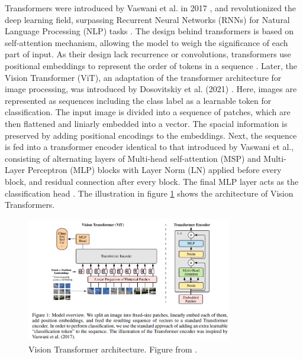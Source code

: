 Transformers were introduced by Vaswani et al. in 2017 \cite{vaswani2023attentionneed}, and revolutionized the deep learning field, surpassing Recurrent Neural Networks (RNNs) for Natural Language Processing (NLP) tasks  \cite{v7labs-vit,vaswani2023attentionneed}. The design behind transformers is based on self-attention mechanism, allowing the model to weigh the significance of each part of input. As their design lack recurrence or convolutions, transformers use positional embeddings to represent the order of tokens in a sequence \cite{vaswani2023attentionneed}. Later, the Vision Transformer (ViT), an adaptation of the transformer architecture for image processing, was introduced by Dosovitskiy et al. (2021) \cite{dosovitskiy2021imageworth16x16words}. Here, images are represented as sequences including the class label as a learnable token for classification. The input image is divided into a sequence of patches, which are then flattened and liniarly embedded into a vector. The spacial information is preserved by adding positional encodings to the embeddings. Next, the sequence is fed into a transformer encoder identical to that introduced by Vaswani et al., consisting of alternating layers of Multi-head self-attention (MSP) and Multi-Layer Perceptron (MLP) blocks with Layer Norm (LN) applied before every block, and residual connection after every block. The final MLP layer acts as the classification head \cite{dosovitskiy2021imageworth16x16words}. The illustration in figure \ref{fig:vit_arch} shows the architecture of Vision Transformers.

\begin{figure}[h!]
    \centering
    \includegraphics[width=0.8\textwidth]{Images/vit.png} 
    \caption{Vision Transformer architecture. Figure from \cite{dosovitskiy2021imageworth16x16words}. }
    \label{fig:vit_arch}
\end{figure}

